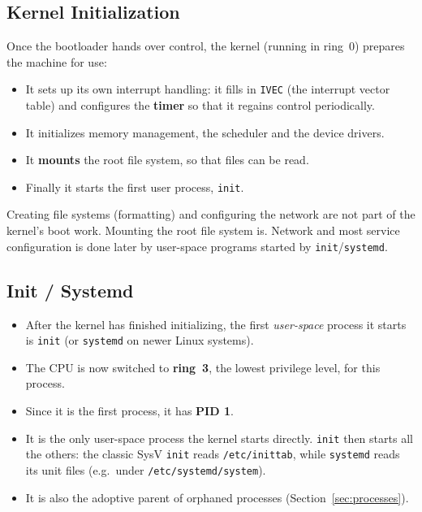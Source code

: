 \documentclass{article}
\newcommand{\reg}[1]{\texttt{#1}}
\begin{document}
\subsection{Kernel Initialization}
\label{sec:kernel-boot}
Once the bootloader hands over control, the kernel (running in ring~0) prepares the machine for use:
\begin{itemize}
	\item It sets up its own interrupt handling: it fills in \reg{IVEC} (the interrupt vector table) and configures the \textbf{timer} so that it regains control periodically.
	\item It initializes memory management, the scheduler and the device drivers.
	\item It \textbf{mounts} the root file system, so that files can be read.
	\item Finally it starts the first user process, \texttt{init}.
\end{itemize}

\begin{pitfall}
	Creating file systems (formatting) and configuring the network are not part of the kernel's boot work. Mounting the root file system is. Network and most service configuration is done later by user-space programs started by \texttt{init}/\texttt{systemd}.
\end{pitfall}

\subsection{Init / Systemd}
\label{sec:init}
\begin{itemize}
	\item After the kernel has finished initializing, the first \emph{user-space} process it starts is \texttt{init} (or \texttt{systemd} on newer Linux systems).
	\item The CPU is now switched to \textbf{ring~3}, the lowest privilege level, for this process.
	\item Since it is the first process, it has \textbf{PID 1}.
	\item It is the only user-space process the kernel starts directly. \texttt{init} then starts all the others: the classic SysV \texttt{init} reads \texttt{/etc/inittab}, while \texttt{systemd} reads its unit files (e.g.\ under \texttt{/etc/systemd/system}).
	\item It is also the adoptive parent of orphaned processes (Section~\ref{sec:processes}).
\end{itemize}
\end{document}
